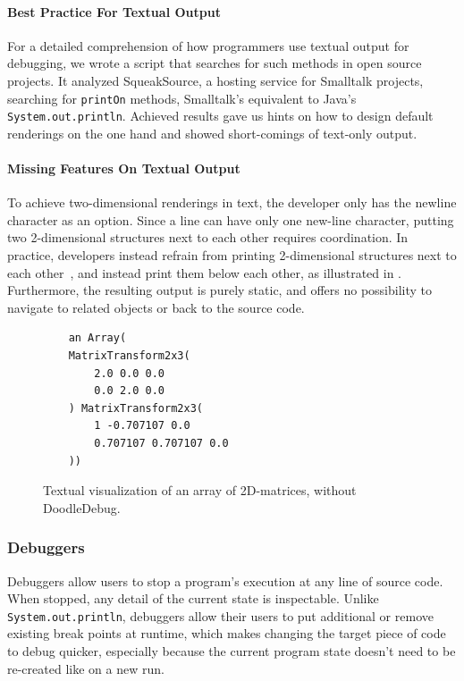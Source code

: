 \documentclass[english]{scrartcl}
\newcommand{\println}{\texttt{Sys\-tem.\-out.\-println}\xspace}
\begin{document}
\paragraph{Best Practice For Textual Output}
For a detailed comprehension of how programmers use textual output for debugging, we wrote a script that searches for such methods in open source projects.
It analyzed SqueakSource, a hosting service for Smalltalk projects, searching for \texttt{printOn} methods, Smalltalk's equivalent to Java's \println.
Achieved results\cite{Schw11b} gave us hints on how to design default renderings on the one hand and showed short-comings of text-only output.

\paragraph{Missing Features On Textual Output}
To achieve two-dimensional renderings in text, the developer only has the newline character as an option.
Since a line can have only one new-line character, putting two 2-dimensional structures next to each other requires coordination. In practice, developers instead refrain from printing 2-dimensional structures next to each other~\cite{Schw11b}, and instead print them below each other, as illustrated in .
Furthermore, the resulting output is purely static, and offers no possibility to navigate to related objects or back to the source code.

\begin{figure}[h]
	\begin{lstlisting}
	an Array(
	MatrixTransform2x3(
		2.0 0.0 0.0
		0.0 2.0 0.0
	) MatrixTransform2x3(
		1 -0.707107 0.0
		0.707107 0.707107 0.0
	))
	\end{lstlisting}
	\caption{Textual visualization of an array of 2D-matrices, without DoodleDebug.}
\end{figure}

\subsubsection{Debuggers}
Debuggers allow users to stop a program's execution at any line of source code.
When stopped, any detail of the current state is inspectable.
Unlike \println, debuggers allow their users to put additional or remove existing break points at runtime, which makes changing the target piece of code to debug quicker, especially because the current program state doesn't need to be re-created like on a new run.
\end{document}
